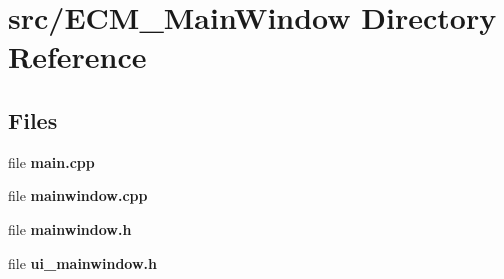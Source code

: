 \section{src/\+E\+C\+M\+\_\+\+Main\+Window Directory Reference}
\label{dir_fc50b93cd80cd7d8408748f915188edc}
\subsection*{Files}
\begin{DoxyCompactItemize}
\item 
file \textbf{ main.\+cpp}
\item 
file \textbf{ mainwindow.\+cpp}
\item 
file \textbf{ mainwindow.\+h}
\item 
file \textbf{ ui\+\_\+mainwindow.\+h}
\end{DoxyCompactItemize}
